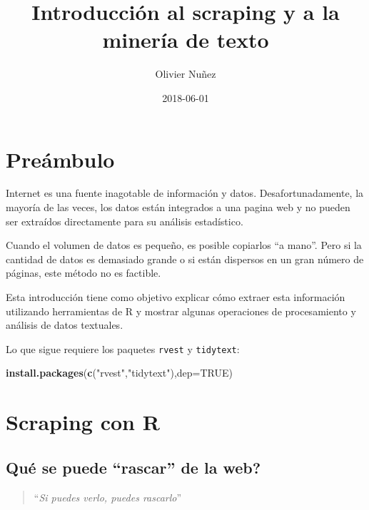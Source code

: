 \documentclass[]{article}
\title{Introducción al scraping y a la minería de texto}
\author{Olivier Nuñez}
\date{2018-06-01}
\newenvironment{Shaded}{\begin{snugshade}}{\end{snugshade}}
\newcommand{\KeywordTok}[1]{\textcolor[rgb]{0.13,0.29,0.53}{\textbf{#1}}}
\newcommand{\DataTypeTok}[1]{\textcolor[rgb]{0.13,0.29,0.53}{#1}}
\newcommand{\StringTok}[1]{\textcolor[rgb]{0.31,0.60,0.02}{#1}}
\newcommand{\OtherTok}[1]{\textcolor[rgb]{0.56,0.35,0.01}{#1}}
\newcommand{\NormalTok}[1]{#1}
\begin{document}
\maketitle

{
\setcounter{tocdepth}{2}
\tableofcontents
}
\section*{Preámbulo}\label{preambulo}

Internet es una fuente inagotable de información y datos.
Desafortunadamente, la mayoría de las veces, los datos están integrados
a una pagina web y no pueden ser extraídos directamente para su análisis
estadístico.

Cuando el volumen de datos es pequeño, es posible copiarlos ``a mano''.
Pero si la cantidad de datos es demasiado grande o si están dispersos en
un gran número de páginas, este método no es factible.

Esta introducción tiene como objetivo explicar cómo extraer esta
información utilizando herramientas de R y mostrar algunas operaciones
de procesamiento y análisis de datos textuales.

Lo que sigue requiere los paquetes \texttt{rvest} y \texttt{tidytext}:

\begin{Shaded}
\begin{Highlighting}[]
\KeywordTok{install.packages}\NormalTok{(}\KeywordTok{c}\NormalTok{(}\StringTok{"rvest"}\NormalTok{,}\StringTok{"tidytext"}\NormalTok{),}\DataTypeTok{dep=}\OtherTok{TRUE}\NormalTok{)}
\end{Highlighting}
\end{Shaded}

\section{Scraping con R}\label{scraping-con-r}

\subsection{\texorpdfstring{Qué se puede ``rascar'' de la
web?}{Qué se puede rascar de la web?}}\label{que-se-puede-rascar-de-la-web}

\begin{quote}
``\emph{Si puedes verlo, puedes rascarlo}''
\end{quote}
\end{document}
